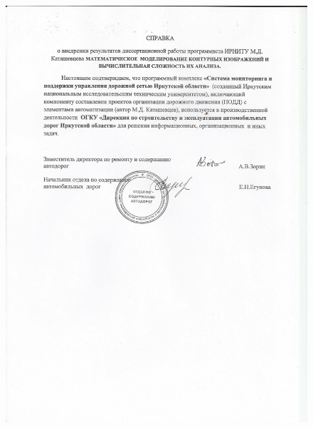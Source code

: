 \begin{figure}[h]
	\centering
	\includegraphics[width=\linewidth]{images/vnedrenie_2.jpg}
\end{figure}
